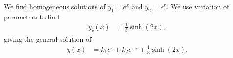 \documentclass[10pt]{mypackage}
\begin{document}
\begin{solution}[4.6, Problem 8]
  We find homogeneous solutions of $y_1 = e^{x}$ and $y_2 = e^x$. We use variation of parameters to find
  \begin{align*}
    y_p(x) &= \frac{1}{3}\sinh(2x),
  \end{align*}
  giving the general solution of
  \begin{align*}
    y(x) &= k_1e^x + k_2e^{-x} + \frac{1}{3}\sinh(2x).
  \end{align*}
\end{solution}
\begin{solution}[4.6, Problem 14]

\end{solution}
\begin{solution}[4.6, Problem 31]

\end{solution}
\begin{solution}[4.7, Problem 4]

\end{solution}
\begin{solution}[4.7, Problem 10]

\end{solution}
\begin{solution}[4.7, Problem 12]

\end{solution}
\begin{solution}[4.7, Problem 14]

\end{solution}
\begin{solution}[4.7, Problem 16]

\end{solution}
\begin{solution}[4.7, Problem 18]

\end{solution}
\begin{solution}[4.7, Problem 32]

\end{solution}
\end{document}

